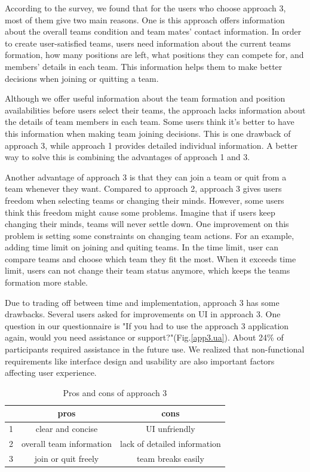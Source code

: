 \documentclass[conference]{IEEEtran}
\begin{document}
According to the survey, we found that for the users who choose approach 3, most of them give two main reasons. One is this approach offers information about the overall teams condition and team mates' contact information. In order to create user-satisfied teams, users need information about the current teams formation, how many positions are left, what positions they can compete for, and members' details in each team. This information helps them to make better decisions when joining or quitting a team. 

Although we offer useful information about the team formation and position availabilities before users select their teams, the approach lacks information about the details of team members in each team. Some users think it's better to have this information when making team joining decisions. This is one drawback of approach 3, while approach 1 provides detailed individual information. A better way to solve this is combining the advantages of approach 1 and 3.

Another advantage of approach 3 is that they can join a team or quit from a team whenever they want. Compared to approach 2, approach 3 gives users freedom when selecting teams or changing their minds. However, some users think this freedom might cause some problems. Imagine that if users keep changing their minds, teams will never settle down. One improvement on this problem is setting some constraints on changing team actions. For an example, adding time limit on joining and quiting teams. In the time limit, user can compare teams and choose which team they fit the most. When it exceeds time limit, users can not change their team status anymore, which keeps the teams formation more stable.

Due to trading off between time and implementation, approach 3 has some drawbacks. Several users asked for improvements on UI in approach 3. One question in our questionnaire is "If you had to use the approach 3 application again, would you need assistance or support?"(Fig.\ref{app3.ua}). About 24\% of participants required assistance in the future use. We realized that non-functional requirements like interface design and usability are also important factors affecting user experience.

 \begin{table}[!htb]\centering
 \begin{tabular} { | c | c |  c |}
 \hline
&pros & cons\\
 \hline
1& clear and concise & UI unfriendly\\
 \hline
2& overall team information & lack of detailed information\\
 \hline
3&join or quit freely & team breaks easily\\
 \hline
 \end{tabular}
 \caption{Pros and cons of approach 3}
 \end{table}
\end{document}
